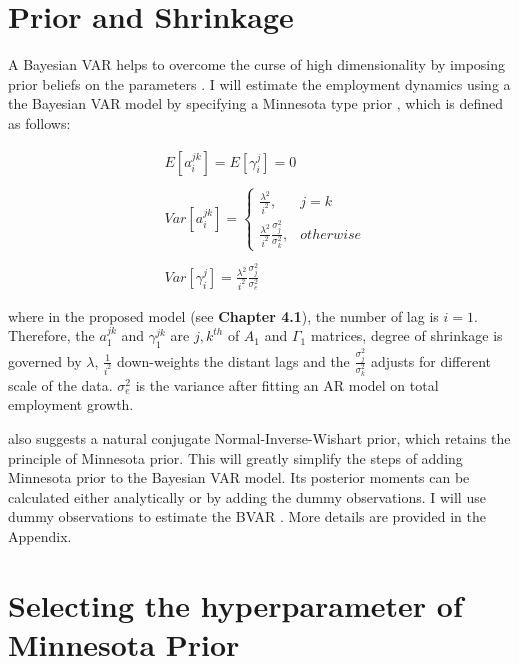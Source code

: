 \documentclass{monashthesis}
\begin{document}
\hypertarget{prior-and-shrinkage}{%
\section{Prior and Shrinkage}\label{prior-and-shrinkage}}

A Bayesian VAR helps to overcome the curse of high dimensionality by imposing prior beliefs on the parameters \autocite{banbura2010large}. I will estimate the employment dynamics using a the Bayesian VAR model by specifying a Minnesota type prior \autocites[e.g.][]{anderson2020,litterman1986,robertson1999vector}, which is defined as follows:

\[
\begin{aligned}\label{eq:1}
&E[a_{i}^{jk}] = E[\gamma_{i}^j]=0\\
\\
&Var[a_i^{jk}]= 
\begin{cases}
\frac{\lambda^2}{i^2},&j=k\\
\frac{\lambda^2}{i^2}\frac{\sigma^2_{j}}{\sigma^2_k},& otherwise
\end{cases}\\
\\
&Var[\gamma_i^{j}]=\frac{\lambda^2}{i^2}\frac{\sigma^2_{j}}{\sigma^2_e}
\end{aligned}
\]

where in the proposed model (see \textbf{Chapter 4.1}), the number of lag is \(i=1\). Therefore, the \(a_{1}^{jk}\) and \(\gamma_{1}^{jk}\) are \({j,k}^{th}\) of \(A_1\) and \(\Gamma_1\) matrices, degree of shrinkage is governed by \(\lambda\), \(\frac{1}{i^2}\) down-weights the distant lags and the \(\frac{\sigma_j^2}{\sigma_k^2}\) adjusts for different scale of the data. \(\sigma^2_e\) is the variance after fitting an AR model on total employment growth.

\textcite{banbura2010large} also suggests a natural conjugate Normal-Inverse-Wishart prior, which retains the principle of Minnesota prior. This will greatly simplify the steps of adding Minnesota prior to the Bayesian VAR model. Its posterior moments can be calculated either analytically or by adding the dummy observations. I will use dummy observations to estimate the BVAR \autocite{banbura2010large}. More details are provided in the Appendix.

\hypertarget{selecting-the-hyperparameter-of-minnesota-prior}{%
\section{Selecting the hyperparameter of Minnesota Prior}\label{selecting-the-hyperparameter-of-minnesota-prior}}
\end{document}
